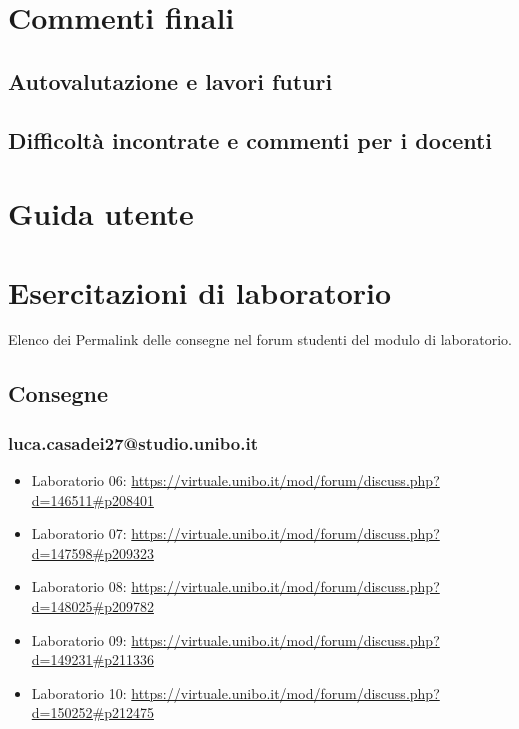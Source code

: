 \documentclass[a4paper,12pt]{report}
\begin{document}
\chapter{Commenti finali}

\section{Autovalutazione e lavori futuri}
\section{Difficoltà incontrate e commenti per i docenti}

\appendix
\chapter{Guida utente}

\chapter{Esercitazioni di laboratorio}
Elenco dei Permalink delle consegne nel forum studenti del modulo di laboratorio.
\section*{Consegne}
\subsection{luca.casadei27@studio.unibo.it}
\begin{itemize}
	\item Laboratorio 06: \url{https://virtuale.unibo.it/mod/forum/discuss.php?d=146511#p208401}
	\item Laboratorio 07: \url{https://virtuale.unibo.it/mod/forum/discuss.php?d=147598#p209323}
	\item Laboratorio 08: \url{https://virtuale.unibo.it/mod/forum/discuss.php?d=148025#p209782}
	\item Laboratorio 09: \url{https://virtuale.unibo.it/mod/forum/discuss.php?d=149231#p211336}
	\item Laboratorio 10: \url{https://virtuale.unibo.it/mod/forum/discuss.php?d=150252#p212475}
\end{itemize}
\end{document}
